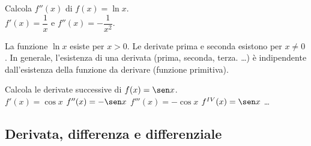 \begin{esempio}
Calcola $f''(x)$ di $f(x)=\ln x$.\\
$f'(x)=\dfrac{1}{x}$ e $f''(x)=-\dfrac{1}{x^2}$.\\
\begin{osservazione}
 La funzione $\ln x $ esiste per $x>0$. Le derivate prima e seconda esistono
 per $x\ne 0$.
 In generale, l'esistenza di una derivata (prima, seconda, terza. \dots) è
 indipendente dall'esistenza della funzione da derivare (funzione primitiva).
\end{osservazione}
\end{esempio}

\begin{esempio}
 Calcola le derivate successive di $f(x)=\sen x$.\\
 $f'(x)=\cos x$ \hspace{1cm}$ f''(x)=-\sen x$ \hspace{1cm}
 $f'''(x)=-\cos x$ \hspace{1cm} $f^{IV}(x)=\sen x$ \dots
\end{esempio}


\subsection{Derivata, differenza e differenziale}
\label{subsec:diff01_deridiff}

